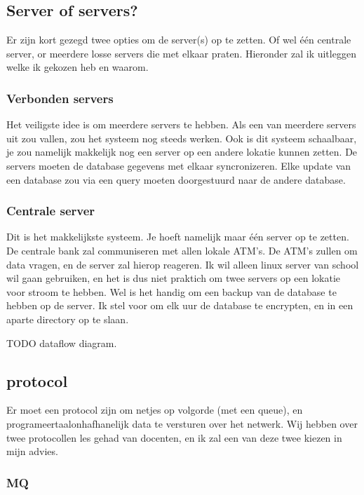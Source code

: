\documentclass{article}
\begin{document}
\subsection{Server of servers?} 

Er zijn kort gezegd twee opties om de server(s) op te zetten.
Of wel \'e\'en centrale server, or meerdere losse servers die met elkaar praten.
Hieronder zal ik uitleggen welke ik gekozen heb en waarom.

\subsubsection{Verbonden servers}

Het veiligste idee is om meerdere servers te hebben.
Als een van meerdere servers uit zou vallen, zou het systeem nog steeds werken.
Ook is dit systeem schaalbaar, je zou namelijk makkelijk nog een server op een andere lokatie kunnen zetten.
De servers moeten de database gegevens met elkaar syncronizeren.
Elke update van een database zou via een query moeten doorgestuurd naar de andere database.

\subsubsection{Centrale server}

Dit is het makkelijkste systeem.
Je hoeft namelijk maar \'e\'en server op te zetten.
De centrale bank zal communiseren met allen lokale ATM's.
De ATM's zullen om data vragen, en de server zal hierop reageren.
Ik wil alleen linux server van school wil gaan gebruiken, en het is dus niet praktich om twee servers op een lokatie voor stroom te hebben.
Wel is het handig om een backup van de database te hebben op de server.
Ik stel voor om elk uur de database te encrypten, en in een aparte directory op te slaan.

TODO dataflow diagram.

\subsection{protocol}

Er moet een protocol zijn om netjes op volgorde (met een queue), en programeertaalonhafhanelijk data te versturen over het netwerk.
Wij hebben over twee protocollen les gehad van docenten, en ik zal een van deze twee kiezen in mijn advies.

\subsubsection{MQ}
\end{document}
